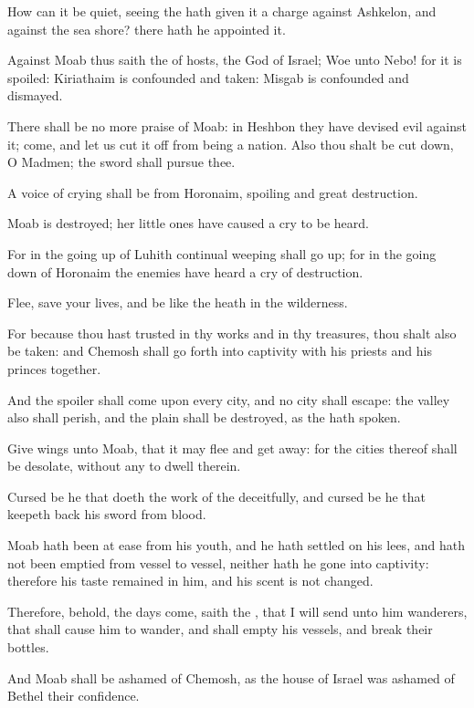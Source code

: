 \Verse How can it be quiet, seeing the \LORD hath given it a charge against Ashkelon, and against the sea shore? there hath he appointed it.


\Chapter
\Verse Against Moab thus saith the \LORD of hosts, the God of Israel; Woe unto Nebo! for it is spoiled: Kiriathaim is confounded and taken: Misgab is confounded and dismayed.

\Verse There shall be no more praise of Moab: in Heshbon they have devised evil against it; come, and let us cut it off from being a nation. Also thou shalt be cut down, O Madmen; the sword shall pursue thee.

\Verse A voice of crying shall be from Horonaim, spoiling and great destruction.

\Verse Moab is destroyed; her little ones have caused a cry to be heard.

\Verse For in the going up of Luhith continual weeping shall go up; for in the going down of Horonaim the enemies have heard a cry of destruction.

\Verse Flee, save your lives, and be like the heath in the wilderness.

\Verse For because thou hast trusted in thy works and in thy treasures, thou shalt also be taken: and Chemosh shall go forth into captivity with his priests and his princes together.

\Verse And the spoiler shall come upon every city, and no city shall escape: the valley also shall perish, and the plain shall be destroyed, as the \LORD hath spoken.

\Verse Give wings unto Moab, that it may flee and get away: for the cities thereof shall be desolate, without any to dwell therein.

\Verse Cursed be he that doeth the work of the \LORD deceitfully, and cursed be he that keepeth back his sword from blood.

\Verse Moab hath been at ease from his youth, and he hath settled on his lees, and hath not been emptied from vessel to vessel, neither hath he gone into captivity: therefore his taste remained in him, and his scent is not changed.

\Verse Therefore, behold, the days come, saith the \LORD, that I will send unto him wanderers, that shall cause him to wander, and shall empty his vessels, and break their bottles.

\Verse And Moab shall be ashamed of Chemosh, as the house of Israel was ashamed of Bethel their confidence.

